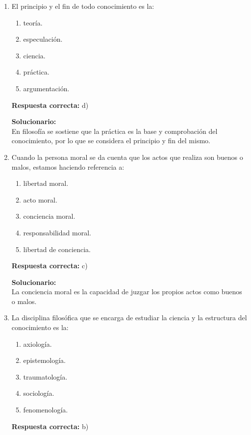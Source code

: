 \begin{enumerate}
	
	\item El principio y el fin de todo conocimiento es la:
	\begin{enumerate}[label=\alph*)]
		\item teoría.
		\item especulación.
		\item ciencia.
		\item práctica.
		\item argumentación.
	\end{enumerate}
	\textbf{Respuesta correcta:} d)
	
	\vspace{2mm}
	\textbf{Solucionario:}\\
	En filosofía se sostiene que la práctica es la base y comprobación del conocimiento, por lo que se considera el principio y fin del mismo.
	
	\vspace{6mm}
	
	\item Cuando la persona moral se da cuenta que los actos que realiza son buenos o malos, estamos haciendo referencia a:
	\begin{enumerate}[label=\alph*)]
		\item libertad moral.
		\item acto moral.
		\item conciencia moral.
		\item responsabilidad moral.
		\item libertad de conciencia.
	\end{enumerate}
	\textbf{Respuesta correcta:} c)
	
	\vspace{2mm}
	\textbf{Solucionario:}\\
	La conciencia moral es la capacidad de juzgar los propios actos como buenos o malos.
	
	\vspace{6mm}
	
	\item La disciplina filosófica que se encarga de estudiar la ciencia y la estructura del conocimiento es la:
	\begin{enumerate}[label=\alph*)]
		\item axiología.
		\item epistemología.
		\item traumatología.
		\item sociología.
		\item fenomenología.
	\end{enumerate}
	\textbf{Respuesta correcta:} b)
	

\end{enumerate}
